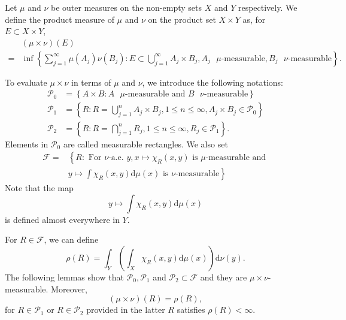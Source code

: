 \begin{definition}
  Let $\mu$ and $\nu$ be outer measures on the non-empty sets $X$ and $Y$ respectively. We define the product measure of  $\mu$ and $\nu$ on the product set $X\times Y$ as, for $E\subset X\times Y$,
  \begin{equation*}
    \begin{aligned}
     & (\mu\times \nu)(E)\\
      =& \inf \left\{ \sum_{j=1}^{\infty} \mu(A_j)\nu(B_j):E\subset \bigcup_{j=1} ^{\infty}A_j\times B_j, A_j \text{ }\mu\text{-measurable}, B_j\text{ } \nu\text{-measurable} \right\} .
    \end{aligned}
  \end{equation*}
\end{definition}

To evaluate $\mu\times \nu$ in terms of $\mu$ and $\nu$, we introduce the following notations:
\begin{align*}
  \mathcal{P}_0&=\left\{ A\times B:A\text{ } \mu\text{-measurable} \text{ and } B\text{ } \nu\text{-measurable} \right\} \\
  \mathcal{P}_1&=\left\{ R:R=\bigcup_{j=1} ^{n}A_j\times B_j, 1\le n\le \infty,A_j\times B_j\in \mathcal{P}_0 \right\} \\
  \mathcal{P}_2&= \left\{ R:R=\bigcap_{j=1} ^{n}R_j,1\le n\le \infty,R_j \in \mathcal{P}_1 \right\} 
.\end{align*}
Elements in $\mathcal{P}_0$ are called measurable rectangles. We also set
\begin{equation*}
  \begin{aligned}
    \mathcal{F}= & \left\{ R:\text{ For }\nu\text{-a.e. }y, x\mapsto \chi_{R}(x,y) \text{ is } \mu\text{-measurable and } \right. \\  
  &\left.  y \mapsto \int \chi_{R}(x,y)\mathrm{d}\mu(x) \text{ is } \nu\text{-measurable}\right\}
  \end{aligned}
\end{equation*}
Note that the map 
\[
  y\mapsto \int\chi_{R}(x,y)\mathrm{d}\mu(x)
\] 
is defined almost everywhere in $Y$.

For $R\in \mathcal{F}$, we can define 
\[
  \rho(R)=\int_{Y}\left( \int_{X}\chi_{R}(x,y)\mathrm{d}\mu(x) \right) \mathrm{d}\nu(y).
\] 
The following lemmas show that  $\mathcal{P}_0,\mathcal{P}_1$ and $\mathcal{P}_2\subset \mathcal{F}$ and they are $\mu\times \nu$-measurable. Moreover,
\[
  (\mu\times \nu)(R)=\rho(R),
\] 
for $R\in \mathcal{P}_1$ or $R\in \mathcal{P}_2$ provided in the latter $R$ satisfies $\rho(R)<\infty$.

